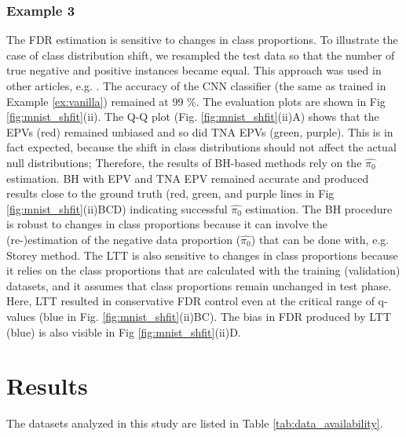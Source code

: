 \documentclass[10pt,letterpaper]{article}
\begin{document}
\subsubsection*{Example 3} The FDR estimation is sensitive to changes in class proportions.
To illustrate the case of class distribution shift, we resampled the test data so that the number of true negative and positive instances became equal.
This approach was used in other articles, e.g.  \cite{joseph_d__viviano__2019}.
The accuracy of the CNN classifier (the same as trained in Example \ref{ex:vanilla}) remained at 99 \%.
The evaluation plots are shown in Fig \ref{fig:mnist_shfit}(ii).
The Q-Q plot (Fig. \ref{fig:mnist_shfit}(ii)A) shows that the EPVs (red) remained unbiased and so did TNA EPVs (green, purple).
This is in  fact expected, because the shift in class distributions should not affect the actual null distributions; Therefore, the results of BH-based methods rely on the $\hat{\pi_0}$ estimation.
BH with EPV and TNA EPV remained accurate and produced results close to the ground truth (red, green, and purple lines in Fig \ref{fig:mnist_shfit}(ii)BCD) indicating successful $\hat{\pi_0}$ estimation.
The BH procedure is robust to changes in class proportions because it can involve the (re-)estimation of the negative data proportion ($\hat{\pi_0}$) that can be done with, e.g. Storey method.
The LTT is also sensitive to changes in class proportions because it relies on the class proportions that are calculated with the training (validation) datasets, and it assumes that class proportions remain unchanged in test phase.
Here, LTT resulted in conservative FDR control even at the critical range of q-values (blue in Fig. \ref{fig:mnist_shfit}(ii)BC).
The bias in FDR produced by LTT (blue) is also visible in Fig \ref{fig:mnist_shfit}(ii)D. 

\section*{Results}
The datasets analyzed in this study are listed in Table \ref{tab:data_availability}.
\end{document}
